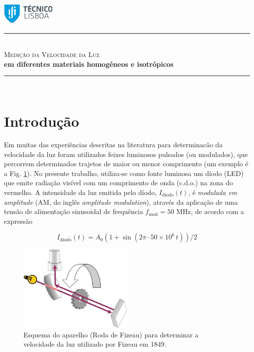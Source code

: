 \documentclass[a4paper,12pt]{article}      %
\author{Prof. Bernardo B. Carvalho}
\date{ Outubro 2012}
\newcommand{\HRule}{\rule{\linewidth}{0.5mm}}
\begin{document}
 

	\includegraphics[width=0.2\textwidth]{../../logo-ist}%

	\HRule \\[0.5cm]
	{ \huge \sf  \textsc{Medição da Velocidade da Luz} }\\[0.4cm] %
	{ \large \bfseries em diferentes materiais homogéneos e isotrópicos}\\
	\HRule \\%


\section{\sf Introdução}
Em muitas das experiências descritas na literatura para determinacão da velocidade da luz foram utilizados feixes luminosos pulsados (ou modulados), que percorrem determinados trajetos de maior ou menor comprimento (um exemplo é a Fig. \ref{fig:Fizeau}). 
No presente trabalho, utiliza-se como fonte luminosa um díodo (LED) que emite radiação  visível com um comprimento de onda (c.d.o.) na zona do vermelho. A intensidade da luz emitida pelo díodo, $I_{\textrm{diodo}}(t)$, é \emph{modulada em amplitude} (AM, do inglês \emph{amplitude modulation}), através da aplicação de uma tensão de alimentação sinusoidal de frequência $f_{\textrm{mod}}=50$ MHz, de acordo com a expressão

\begin{equation*}
	\label{eq:f_am}
		I_{\textrm{diodo}}(t) = A_0 (1+ \sin ( 2\pi \cdot 50\times 10^6 \, t))/2
\end{equation*}

\begin{figure}
	[ht!b]  \centering 
	\includegraphics[width=0.5\textwidth]{Fizeau}
	\caption{Esquema do aparelho (Roda de Fizeau) para determinar a velocidade da luz utilizado por Fizeau em 1849. \label{fig:Fizeau}} 
\end{figure}
\end{document}
